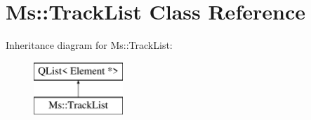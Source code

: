 \hypertarget{class_ms_1_1_track_list}{}\section{Ms\+:\+:Track\+List Class Reference}
\label{class_ms_1_1_track_list}
Inheritance diagram for Ms\+:\+:Track\+List\+:\begin{figure}[H]
\begin{center}
\leavevmode
\includegraphics[height=2.000000cm]{class_ms_1_1_track_list}
\end{center}
\end{figure}
